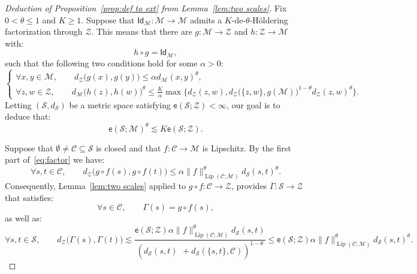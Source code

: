 \documentclass[10pt,a4paper]{amsart}
\newcommand{\Id}{\mathsf{Id}}
\DeclareMathOperator{\Lip}{Lip}
\newcommand{\MM}{\mathcal{M}}
\renewcommand{\SS}{\mathscr{S}}
\newcommand{\cZ}{\mathcal{Z}}
\newcommand{\ee}{\mathsf{e}}
\renewcommand{\ge}{\geqslant}
\renewcommand{\le}{\leqslant}
\newcommand{\sub}{\mathscr{C}}
\renewcommand{\subset}{\subseteq}
\begin{document}
\begin{proof}[Deduction of Proposition~\ref{prop:def to ext}  from Lemma~\ref{lem:two scales}] Fix $0<\theta\le 1$ and $K\ge 1$. Suppose that  $\Id_\MM:\MM\to \MM$ admits a $K$-de-$\theta$-H\"oldering factorization through  $\cZ$. This means that there are $g:\MM\to \cZ$ and $h:\cZ\to \MM$ with: 
\begin{equation}\label{eq:composition identity}
h\circ g=\Id_\MM,
\end{equation} 
such that the following two conditions hold for some $\alpha>0$: 
\begin{equation}\label{eq:factor}
\left\{\begin{array}{ll}
\forall x,y\in \MM,\qquad d_\cZ\big(g(x),g(y)\big)\le \alpha d_\MM(x,y)^{\theta},\\ \forall z,w\in \cZ,\qquad d_\MM\big(h(z),h(w)\big)^\theta \le \frac{K}{\alpha}  \max \big\{d_\cZ(z,w),  d_\cZ\big(\{z,w\},g(\MM)\big)^{1-\theta}d_\cZ(z,w)^\theta\big\}.\end{array}\right. 
\end{equation}
 Letting $(\SS,d_\SS)$ be a metric space satisfying $\ee(\SS;\cZ)<\infty$, our goal is to deduce that:   
 \begin{equation}\label{eq:restate extension goal}
 \ee(\SS;\MM)^\theta\lesssim K\ee(\SS;\cZ).
 \end{equation} 

Suppose that  $\emptyset\neq \sub\subset \SS$ is closed and that $f:\sub\to \MM$ is Lipschitz. By the first part of~\eqref{eq:factor} we have:
$$
\forall s,t\in \sub,\qquad d_\cZ\big(g\circ f(s),g\circ f(t)\big)\le \alpha \|f\|_{\Lip(\sub;\MM)}^\theta d_\SS(s,t)^\theta. 
$$
Consequently,  Lemma~\ref{lem:two scales} applied to $g\circ f:\sub\to \cZ$, provides $\Gamma:\SS\to \cZ$  that satisfies:
\begin{equation}\label{eq:Gamma composition}
\forall s\in \sub,\qquad \Gamma(s)=g\circ f(s),
\end{equation}
as well as: 
\begin{equation}\label{eq:Gamma}
\forall s,t\in \SS,\qquad  d_\cZ\big(\Gamma(s),\Gamma(t)\big)\lesssim   \frac{\ee(\SS;\cZ)\alpha \|f\|_{\Lip(\sub;\MM)}^\theta d_\SS(s,t) }{\left(d_\SS(s,t)^{\phantom{2}}\!\!\!\!+d_\SS(\{s,t\},\sub)\right)^{1-\theta}}\le \ee(\SS;\cZ)\alpha \|f\|_{\Lip(\sub;\MM)}^\theta d_\SS(s,t)^\theta.
\end{equation}


\end{proof}
\end{document}
